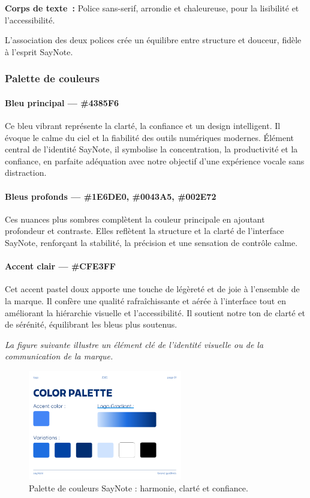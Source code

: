 \textbf{Corps de texte~:}
Police sans-serif, arrondie et chaleureuse, pour la lisibilité et l’accessibilité.

L’association des deux polices crée un équilibre entre structure et douceur, fidèle à l’esprit SayNote.

\subsubsection{Palette de couleurs}
\paragraph{Bleu principal — \#4385F6}
Ce bleu vibrant représente la clarté, la confiance et un design intelligent. Il évoque le calme du ciel et la fiabilité des outils numériques modernes. Élément central de l’identité SayNote, il symbolise la concentration, la productivité et la confiance, en parfaite adéquation avec notre objectif d’une expérience vocale sans distraction.

\paragraph{Bleus profonds — \#1E6DE0, \#0043A5, \#002E72}
Ces nuances plus sombres complètent la couleur principale en ajoutant profondeur et contraste. Elles reflètent la structure et la clarté de l’interface SayNote, renforçant la stabilité, la précision et une sensation de contrôle calme.

\paragraph{Accent clair — \#CFE3FF}
Cet accent pastel doux apporte une touche de légèreté et de joie à l’ensemble de la marque. Il confère une qualité rafraîchissante et aérée à l’interface tout en améliorant la hiérarchie visuelle et l’accessibilité. Il soutient notre ton de clarté et de sérénité, équilibrant les bleus plus soutenus.

\noindent
\textit{La figure suivante illustre un élément clé de l'identité visuelle ou de la communication de la marque.}
\begin{figure}[H]
    \centering
    \includegraphics[width=0.6\textwidth]{docs/visual-indentity/pictures/color-palette.png}
    \caption{Palette de couleurs SayNote : harmonie, clarté et confiance.}
\end{figure}

